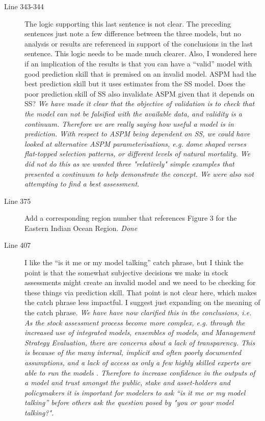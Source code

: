 \begin{itemize}
\begin{description}
\item[Line 343-344] The logic supporting this last sentence is not clear. The preceding sentences just note a few difference between the three models, but no analysis or results are referenced in support of the conclusions in the last sentence. This logic needs to be made much clearer. Also, I wondered here if an implication of the results is that you can have a “valid” model with good prediction skill that is premised on an invalid model. ASPM had the best prediction skill but it uses estimates from the SS model. Does the poor prediction skill of SS also invalidate ASPM given that it depends on SS?
\textit{\newline We have made it clear that the objective of validation is to check that the model can not be falsified with the available data, and validity is a continuum. Therefore we are really saying  how useful a model is in prediction. With respect to ASPM being dependent on SS, we could have looked at alternative ASPM parameterisations, e.g. dome shaped verses flat-topped selection patterns, or different levels of natural mortality. We did not do this as we wanted three "relatively" simple examples that presented a continuum to help demonstrate the concept. We were also not attempting to find a best assessment.}

\item[Line 375] Add a corresponding region number that references Figure 3 for the Eastern Indian Ocean Region.
\textit{\newline Done}

\item[Line 407] I like the “is it me or my model talking” catch phrase, but I think the point is that the somewhat subjective decisions we make in stock assessments might create an invalid model and we need to be checking for these things via prediction skill. That point is not clear here, which makes the catch phrase less impactful. I suggest just expanding on the meaning of the catch phrase.
\textit{\newline We have have now clarified this in the conclusions, i.e. 
As the stock assessment process become more complex, e.g. through the increased use of integrated models, ensembles of models, and Management Strategy Evaluation, there are concerns about a lack of transparency. This is because of the many internal, implicit and often poorly documented assumptions, and a lack of access as only a few highly skilled experts are able to run the models \citep{hilborn2003state}. Therefore to increase confidence in the outputs of a model and trust amongst the public, stake and asset-holders and policymakers it is important for modelers to ask “is it me or my model talking” before others ask the question posed by \cite{hodges1992you} "you or your model talking?".} 


\end{description}
\end{itemize}

